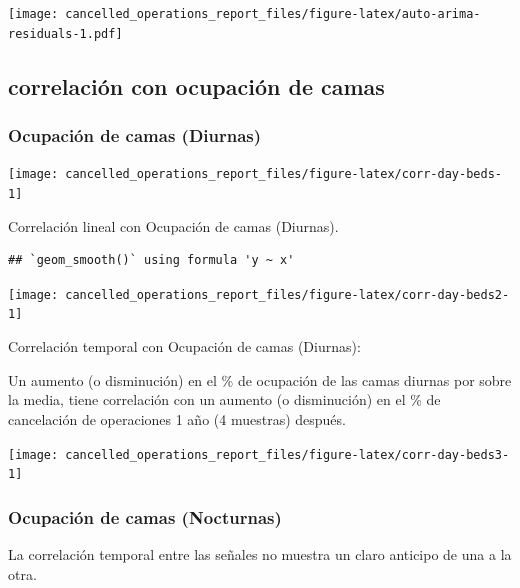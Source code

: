\documentclass[
]{article}
\begin{document}
\texttt{[image: cancelled\_operations\_report\_files/figure-latex/auto-arima-residuals-1.pdf]}

\hypertarget{correlaciuxf3n-con-ocupaciuxf3n-de-camas}{%
\subsection{correlación con ocupación de
camas}\label{correlaciuxf3n-con-ocupaciuxf3n-de-camas}}

\hypertarget{ocupaciuxf3n-de-camas-diurnas}{%
\subsubsection{Ocupación de camas
(Diurnas)}\label{ocupaciuxf3n-de-camas-diurnas}}

\begin{center}\texttt{[image: cancelled\_operations\_report\_files/figure-latex/corr-day-beds-1]} \end{center}

Correlación lineal con Ocupación de camas (Diurnas).

\begin{verbatim}
## `geom_smooth()` using formula 'y ~ x'
\end{verbatim}

\begin{center}\texttt{[image: cancelled\_operations\_report\_files/figure-latex/corr-day-beds2-1]} \end{center}

Correlación temporal con Ocupación de camas (Diurnas):

Un aumento (o disminución) en el \% de ocupación de las camas diurnas
por sobre la media, tiene correlación con un aumento (o disminución) en
el \% de cancelación de operaciones 1 año (4 muestras) después.

\begin{center}\texttt{[image: cancelled\_operations\_report\_files/figure-latex/corr-day-beds3-1]} \end{center}

\hypertarget{ocupaciuxf3n-de-camas-nocturnas}{%
\subsubsection{Ocupación de camas
(Nocturnas)}\label{ocupaciuxf3n-de-camas-nocturnas}}

La correlación temporal entre las señales no muestra un claro anticipo
de una a la otra.
\end{document}
